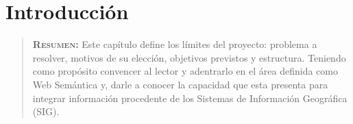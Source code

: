 




\chapter{Introducción}
\label{ch:introduccion}

\begin{quote}
  {\bf\textsc{Resumen:}} Este capítulo define los límites del proyecto: problema a resolver, motivos de su elección, objetivos previstos y estructura. Teniendo como propósito convencer al lector y adentrarlo en el área definida como Web Semántica y, darle a conocer la capacidad que esta presenta para integrar información procedente de los Sistemas de Información Geográfica (SIG).
\end{quote}


